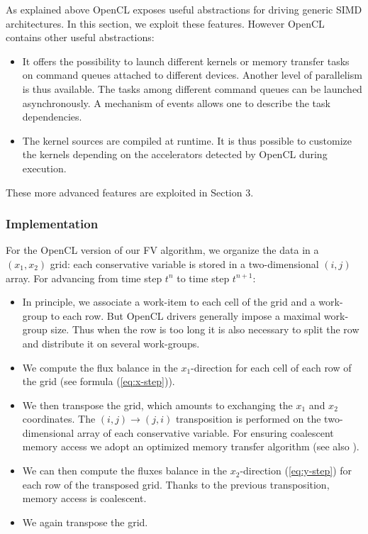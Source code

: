 \documentclass[12pt]{amsart}
\begin{document}
As explained above OpenCL exposes useful abstractions for driving generic SIMD architectures. In this section, we exploit these features. However OpenCL  contains other useful abstractions:
\begin{itemize}
\item It offers the possibility to launch different kernels or memory transfer tasks on command queues attached to different devices. Another level of parallelism is thus available. The tasks  among different command queues can be launched asynchronously. A mechanism of events allows one to describe the task dependencies.
\item The kernel sources are compiled at runtime. It is thus possible to customize the kernels  depending on the accelerators detected by OpenCL during execution.
\end{itemize}
These more advanced features are exploited in Section 3.%

\subsubsection{Implementation}
For the OpenCL version of our FV algorithm, we organize the data in a $(x_{1},x_{2})$ grid: each conservative variable is stored in a two-dimensional $(i,j)$ array. For advancing from time step $t^n$ to time step $t^{n+1}$:
\begin{itemize}
\item In principle, we associate a work-item to each cell of the grid and a work-group
to each row. But OpenCL drivers generally impose a maximal work-group size. Thus when the row is too long it is also necessary to split the row and distribute it on several work-groups.
\item We compute the flux balance in the $x_{1}$-direction for each cell
of each row of the grid (see formula (\ref{eq:x-step})).
\item We then transpose the grid, which amounts to exchanging the $x_{1}$ and $x_{2}$ coordinates. The $(i,j)\to (j,i)$ transposition is performed on the two-dimensional array of each conservative variable. For ensuring coalescent memory access we adopt an optimized
memory transfer algorithm \cite{ruetsch2009optimizing} (see also
\cite{michea2010accelerating}).
\item We can then compute the fluxes balance in the $x_{2}$-direction (\ref{eq:y-step}) for each row
of the transposed grid. Thanks to the previous transposition, memory access is coalescent.
\item We again transpose the grid.
\end{itemize}
\end{document}

